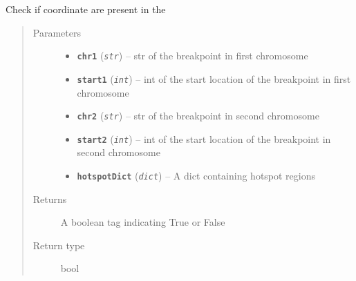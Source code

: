 \documentclass[letterpaper,10pt,english]{sphinxmanual}
\begin{document}
\begin{fulllineitems}
\label{iCallSV:iCallSV.checkHotSpotList.CheckIfItIsHotspot}
Check if coordinate are present in the 
\begin{quote}\begin{description}
\item[{Parameters}] \leavevmode\begin{itemize}
\item {} 
\textbf{\texttt{chr1}} (\emph{\texttt{str}}) -- str of the breakpoint in first chromosome

\item {} 
\textbf{\texttt{start1}} (\emph{\texttt{int}}) -- int of the start location of the breakpoint in first chromosome

\item {} 
\textbf{\texttt{chr2}} (\emph{\texttt{str}}) -- str of the breakpoint in second chromosome

\item {} 
\textbf{\texttt{start2}} (\emph{\texttt{int}}) -- int of the start location of the breakpoint in second chromosome

\item {} 
\textbf{\texttt{hotspotDict}} (\emph{\texttt{dict}}) -- A dict containing hotspot regions

\end{itemize}

\item[{Returns}] \leavevmode
A boolean tag indicating True or False

\item[{Return type}] \leavevmode
bool

\end{description}\end{quote}

\end{fulllineitems}

\end{document}
